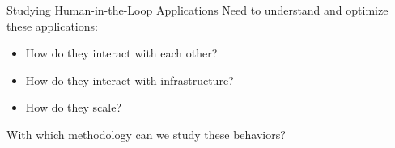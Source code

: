 \documentclass[aspectratio=1610]{beamer}
\begin{document}
\begin{frame}{Studying Human-in-the-Loop Applications}
    Need to understand and optimize these applications:%
    \begin{itemize}
        \item How do they interact with each other?
        \item How do they interact with infrastructure?
        \item How do they scale?
    \end{itemize}%
    \vspace{1em}%
    \begin{center}
        {\Large With which methodology can we study these behaviors?}\\
        \vspace{2em}%
        \\
    \end{center}
\end{frame}
\end{document}
